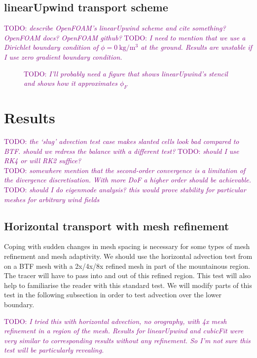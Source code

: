\documentclass[times]{elsarticle}
\newcommand{\TODO}[1]{\textcolor{purple}{TODO: \emph{#1}}}
\begin{document}

\subsection{linearUpwind transport scheme}
\TODO{describe OpenFOAM's linearUpwind scheme and cite something? OpenFOAM docs? OpenFOAM github?}
\TODO{I need to mention that we use a Dirichlet boundary condition of $\phi = \SI{0}{\kilogram\per\meter\cubed}$ at the ground.  Results are unstable if I use  zero gradient boundary condition.}

\begin{figure}
	\caption{\TODO{I'll probably need a figure that shows linearUpwind's stencil and shows how it approximates $\phi_F$}}
\end{figure}

\section{Results}
\TODO{the `slug' advection test case makes slanted cells look bad compared to BTF.  should we redress the balance with a different test?}
\TODO{should I use RK4 or will RK2 suffice?} \\
\TODO{somewhere mention that the second-order convergence is a limitation of the divergence discretisation.  With more DoF a higher order should be achievable.} \\
\TODO{should I do eigenmode analysis?  this would prove stability for particular meshes for arbitrary wind fields}

\subsection{Horizontal transport with mesh refinement}
Coping with sudden changes in mesh spacing is necessary for some types of mesh refinement and mesh adaptivity.  We should use the horizontal advection test from \citet{schaer2002} on a BTF mesh with a 2x/4x/8x refined mesh in part of the mountainous region.  The tracer will have to pass into and out of this refined region.  This test will also help to familiarise the reader with this standard test.  We will modify parts of this test in the following subsection in order to test advection over the lower boundary.

\TODO{I tried this with horizontal advection, no orography, with 4x mesh refinement in a region of the mesh.  Results for linearUpwind and cubicFit were very similar to corresponding results without any refinement.  So I'm not sure this test will be particularly revealing.}
\end{document}
